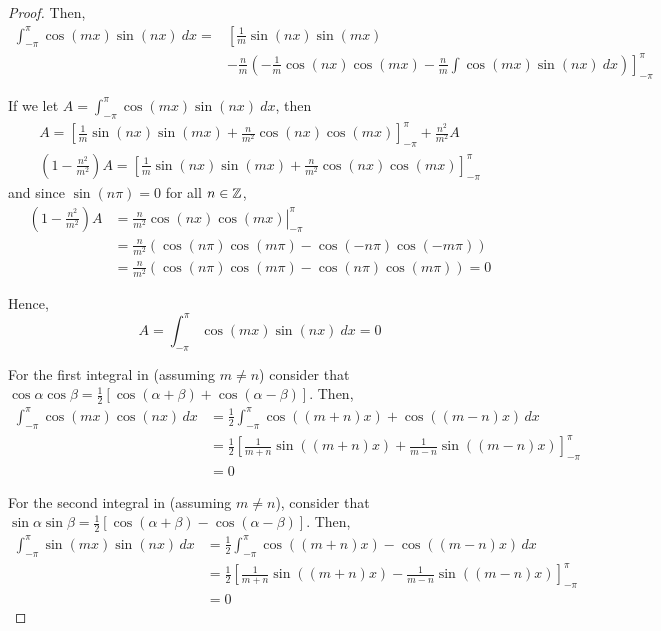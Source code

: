 \begin{problem}
\begin{enumerate}[(a)]
\begin{proof}
        Then,
        \begin{equation}
        \begin{aligned}
        	\int_{-\pi}^{\pi} \cos(mx)\sin(nx) ~dx  = & \left[ \frac{1}{m}\sin(nx)\sin(mx)\right. \\
					& \left.- \frac{n}{m} \left( -\frac{1}{m}\cos(nx)\cos(mx) - \frac{n}{m} \int \cos(mx)\sin(nx) ~dx \right) \right]_{-\pi}^{\pi}
		\end{aligned}
        \end{equation}
        
        If we let \(A = \int_{-\pi}^{\pi} \cos(mx)\sin(nx) ~dx\), then
        \begin{gather}
        A =  \left[ \frac{1}{m}\sin(nx)\sin(mx) + \frac{n}{m^2}\cos(nx)\cos(mx)\right]_{-\pi}^{\pi} + \frac{n^2}{m^2} A \\
        \left(1 - \frac{n^2}{m^2}\right)A = \left[ \frac{1}{m}\sin(nx)\sin(mx) + \frac{n}{m^2}\cos(nx)\cos(mx)\right]_{-\pi}^{\pi}
        \end{gather}
        and since \(\sin(n\pi) = 0\) for all \(n \in \mathbb{Z}\),
        \begin{align}
        \left(1 - \frac{n^2}{m^2}\right)A & = \left. \frac{n}{m^2}\cos(nx)\cos(mx)\right|_{-\pi}^{\pi} \\
        & = \frac{n}{m^2} \left(\cos(n\pi)\cos(m\pi) - \cos(-n\pi)\cos(-m\pi) \right) \\
        & = \frac{n}{m^2} \left(\cos(n\pi)\cos(m\pi) - \cos(n\pi)\cos(m\pi) \right) = 0
		\end{align}
		
		Hence,
		\begin{equation*}
		A = \int_{-\pi}^{\pi} \cos(mx)\sin(nx) ~dx = 0
		\end{equation*}
		
		For the first integral in  (assuming \(m \neq n\)) consider that \(\cos\alpha \cos\beta = \frac{1}{2}[\cos(\alpha + \beta) + \cos(\alpha - \beta)]\). Then,
		\begin{align}
			\int_{-\pi}^{\pi} \cos(mx)\cos(nx) \, dx 
			& = \frac{1}{2}\int_{-\pi}^{\pi} \cos((m+n)x) + \cos((m-n)x) \, dx \\
			& = \frac{1}{2}\left[ \frac{1}{m+n}\sin((m+n)x) + \frac{1}{m-n}\sin((m-n)x) \right]_{-\pi}^{\pi} \\
			& = 0
		\end{align}
		
		For the second integral in  (assuming \(m \neq n\)), consider that \(\sin\alpha \sin\beta = \frac{1}{2}[\cos(\alpha + \beta) - \cos(\alpha - \beta)]\). Then,
		\begin{align}
			\int_{-\pi}^{\pi} \sin(mx)\sin(nx) \, dx 
			& = \frac{1}{2}\int_{-\pi}^{\pi} \cos((m+n)x) - \cos((m-n)x) \, dx \\
			& = \frac{1}{2}\left[ \frac{1}{m+n}\sin((m+n)x) - \frac{1}{m-n}\sin((m-n)x) \right]_{-\pi}^{\pi} \\
			& = 0
		\end{align}
        \end{proof}
    \end{enumerate}
\end{problem}